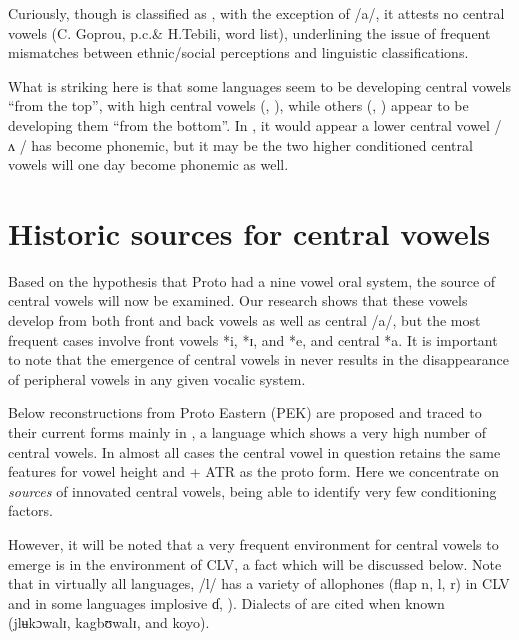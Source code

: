 \documentclass[output=paper
,newtxmath
,modfonts
,nonflat]{langsci/langscibook}
\begin{document}
Curiously, though  is classified as , with the exception of /a/, it attests no central vowels (C. Goprou, p.c.\& H.Tebili, word list), underlining the issue of frequent mismatches between ethnic/social perceptions and linguistic classifications. 

What is striking here is that some languages seem to be developing central vowels “from the top”, with high central vowels (,  ), while others (, ) appear to be developing them “from the bottom”.  In , it would appear a lower central vowel / ʌ / has become phonemic, but it may be the two higher conditioned central vowels will one day become phonemic as well. 

\section{Historic sources for central vowels}\label{sec:zogbo:3}

Based on the hypothesis that Proto  had a nine vowel oral system, the source of central vowels will now be examined.  Our research shows that these vowels develop from both front and back vowels as well as central /a/, but the most frequent cases involve front vowels *i, *ɪ, and *e, and central *a.  It is important to note that the emergence of central vowels in  never results in the disappearance of peripheral vowels in any given vocalic system.  

Below reconstructions from Proto Eastern  (PEK) are proposed and traced to their current forms mainly in , a language which shows a very high number of central vowels.  In almost all cases the central vowel in question retains the same features for vowel height and + ATR as the proto form.  Here we concentrate on \textit{sources} of innovated central vowels, being able to identify very few conditioning factors. 

However, it will be noted that a very frequent environment for central vowels to emerge is in the environment of CLV, a fact which will be discussed below.  Note that in virtually all  languages, /l/ has a variety of allophones (flap n, l, r) in CLV and in some languages implosive ɗ, \citealt{Marchese1979/1983}). Dialects of  are cited when known (jlʉkɔwalɪ, kagbʊwalɪ, and koyo).
\end{document}
